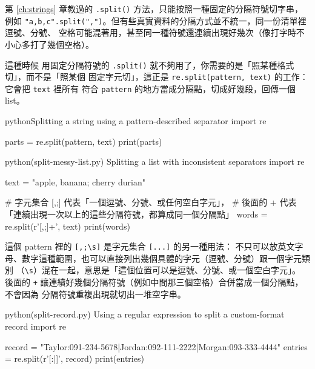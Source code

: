第 \ref{ch:strings} 章教過的 \texttt{.split()} 方法，只能按照一種固定的分隔符號切字串，例如
\texttt{"a,b,c".split(",")}。但有些真實資料的分隔方式並不統一，同一份清單裡逗號、分號、
空格可能混著用，甚至同一種符號還連續出現好幾次（像打字時不小心多打了幾個空格）。

這種時候
用固定分隔符號的 \texttt{.split()} 就不夠用了，你需要的是「照某種格式切」，而不是「照某個
固定字元切」，這正是 \texttt{re.split(pattern, text)} 的工作：它會把 \texttt{text} 裡所有
符合 \texttt{pattern} 的地方當成分隔點，切成好幾段，回傳一個 list。

\begin{code}{python}{Splitting a string using a pattern-described separator}
import re

parts = re.split(pattern, text)
print(parts)
\end{code}

\begin{example}{python}{(split-messy-list.py) Splitting a list with inconsistent separators}
import re

text = "apple, banana;  cherry   durian"

# 字元集合 [,;\s] 代表「一個逗號、分號、或任何空白字元」，
# 後面的 + 代表「連續出現一次以上的這些分隔符號，都算成同一個分隔點」
words = re.split(r'[,;\s]+', text)
print(words)
\end{example}


這個 pattern 裡的 \texttt{[,;\textbackslash s]} 是字元集合 \texttt{[...]} 的另一種用法：
不只可以放英文字母、數字這種範圍，也可以直接列出幾個具體的字元（逗號、分號）跟一個字元類別
（\texttt{\textbackslash s}）混在一起，意思是「這個位置可以是逗號、分號、或一個空白字元」。
後面的 \texttt{+} 讓連續好幾個分隔符號（例如中間那三個空格）合併當成一個分隔點，不會因為
分隔符號重複出現就切出一堆空字串。

\begin{example}{python}{(split-record.py) Using a regular expression to split a custom-format record}
import re

record = "Taylor:091-234-5678|Jordan:092-111-2222|Morgan:093-333-4444"
entries = re.split(r'[:|]', record)
print(entries)
\end{example}


